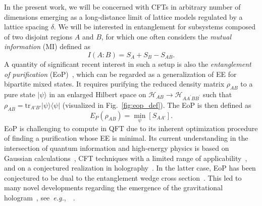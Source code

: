 \documentclass[prl,a4paper,notitlepage,twocolumn,superscriptaddress,longbibliography,reprint]{revtex4-2}
\newcommand{\eg}{{\it e.g.},\ }
\begin{document}
In the present work, we will be concerned with CFTs in arbitrary number of dimensions emerging as a long-distance limit of lattice models regulated by a lattice spacing $\delta$. We will be interested in entanglement for subsystems composed of two disjoint regions $A$ and $B$, for which one often considers the \emph{mutual information} (MI) defined as
\begin{equation}
\label{eq.IAB}
I(A:B) = S_A + S_B - S_{A B}.
\end{equation}
A quantity of significant recent interest in such a setup is also the \emph{entanglement of purification} (EoP)~\cite{Terhal:2002}, which can be regarded as a generalization of EE for bipartite mixed states. It requires purifying the reduced density matrix $\rho_{AB}$ to a pure state $|\psi\rangle$ in an enlarged Hilbert space on $\mathcal{H}_{AB} \to \mathcal{H}_{A A^\prime B B^\prime}$ such that $\rho_{AB} = \mathrm{tr}_{A'B'} |\psi \rangle \langle \psi |$ (visualized in Fig.~\ref{fig:eop_def}). The EoP is then defined as
\begin{equation}
\label{eq.EoPdef}
E_{P}(\rho_{A B}) = \min_{\psi}[S_{A A'}].
\end{equation}
EoP is challenging to compute in QFT due to its inherent optimization procedure of finding a purification whose EE is minimal.
Its current understanding in the intersection of quantum information and high-energy physics is based on Gaussian calculations~\cite{Bhattacharyya:2018sbw,Bhattacharyya:2019tsi,Camargo:2020yfv}, CFT techniques with a limited range of applicability~\cite{Hirai:2018jwy,Caputa:2018xuf,Guo:2019pfl}, and on a conjectured realization in holography~\cite{Takayanagi:2017knl,Nguyen:2017yqw}. In the latter case, EoP has been conjectured to be dual to the entanglement wedge cross section~\cite{Czech:2012bh,Wall:2012uf,Headrick:2014cta,Bao:2017nhh}. This led to many novel developments regarding the emergence of the gravitational hologram~\cite{Dong:2016eik}, see~\eg~\cite{Umemoto:2018jpc,Tamaoka:2018ned,Bao:2018gck,Yang:2018gfq,Nomura:2018kji,Espindola:2018ozt,Liu:2019qje,Harper:2019lff,BabaeiVelni:2019pkw,Amrahi:2020jqg,Jain:2020rbb}. 
\end{document}
